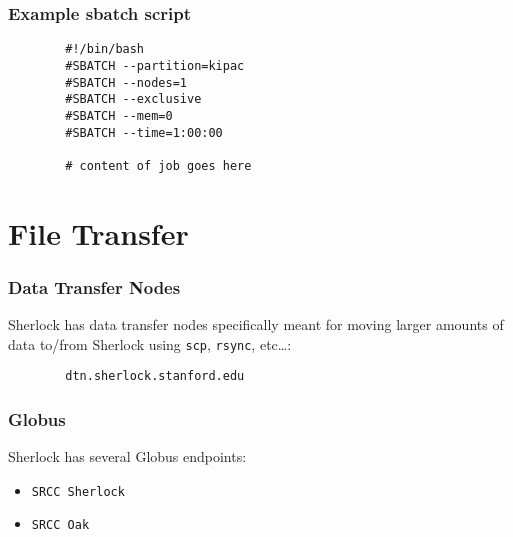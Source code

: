 \documentclass[aspectratio=169]{beamer}
\begin{document}
\begin{frame}[fragile]
	\frametitle{Example sbatch script}
	\begin{verbatim}
		#!/bin/bash
		#SBATCH --partition=kipac
		#SBATCH --nodes=1
		#SBATCH --exclusive
		#SBATCH --mem=0
		#SBATCH --time=1:00:00
		
		# content of job goes here
	\end{verbatim}
\end{frame}



\section{File Transfer}

\frame{\sectionpage}

\begin{frame}[fragile]
	\frametitle{Data Transfer Nodes}
	Sherlock has data transfer nodes specifically meant for moving larger amounts of data to/from Sherlock using \texttt{scp}, \texttt{rsync}, etc\ldots:
	\begin{verbatim}
		dtn.sherlock.stanford.edu
	\end{verbatim}
\end{frame}

\begin{frame}
	\frametitle{Globus}
	Sherlock has several Globus endpoints:
	\begin{itemize}
		\item \texttt{SRCC Sherlock}
		\item \texttt{SRCC Oak}
	\end{itemize}
\end{frame}

\end{document}
